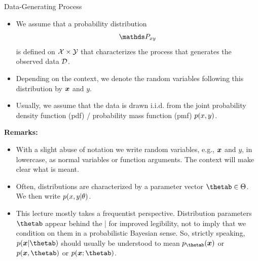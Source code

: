 \documentclass[11pt,compress,t,notes=noshow, xcolor=table]{beamer}
\begin{document}
\begin{vbframe}{Data-Generating Process}

\begin{itemize}
\item We assume that a probability distribution
$$
\Pxy
$$
is defined on $\mathcal{X} \times \mathcal{Y}$ that characterizes the process that generates the observed data $\mathcal{D}$.
\item Depending on the context, we denote the random variables following this distribution by $\bm{x}$ and $y$.
\item Usually, we assume that the data is drawn i.i.d. from the joint probability density function (pdf) / probability mass function (pmf) $p(x,y)$.
\end{itemize}

\framebreak

\textbf{Remarks:}
\begin{itemize}
\item With a slight abuse of notation we write random variables, e.g., $\bm{x}$ and $y$, in lowercase, as normal
variables or function arguments. The context will make clear what is meant.
\item Often, distributions are characterized by a parameter vector $\thetab \in \Theta$. We then write $p(x, y | \theta)$.
\item This lecture mostly takes a frequentist perspective. Distribution parameters $\thetab$ appear behind the | for improved legibility, not to imply that we condition on them in a probabilistic Bayesian sense.
So, strictly speaking, $p(\xv | \thetab)$ should usually be understood to mean $p_{\thetab}(\xv)$ or $p(\xv, \thetab)$ or $p(\xv; \thetab)$.
\end{itemize}

\end{vbframe}




\endlecture
\end{document}
